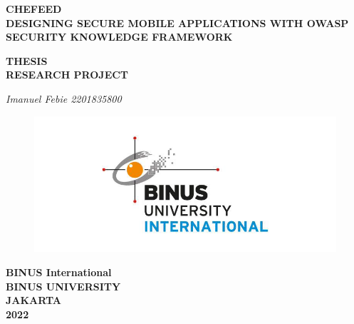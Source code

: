 \begin{titlepage}
\begingroup
    \centering
    {\Large\bfseries CHEFEED} \\
    {\large\bfseries DESIGNING SECURE MOBILE APPLICATIONS WITH OWASP SECURITY KNOWLEDGE FRAMEWORK}

    \vspace{1.5cm}
    
    {\large\bfseries THESIS \\ RESEARCH PROJECT}
    
    \vspace{1.5cm}
    
    {\large {}}

    \vspace{1.5cm}

    {\large\textit{Imanuel Febie 2201835800}}
    
    \begin{figure}[!h]
        \centering
        \includegraphics[width=\textwidth]{img/binus-inter-logo.jpg}
    \end{figure}

    \vspace{1.5cm}

    {\normalize \bfseries BINUS International \\ BINUS UNIVERSITY \\ JAKARTA \\ 2022}

\endgroup
\end{titlepage}
